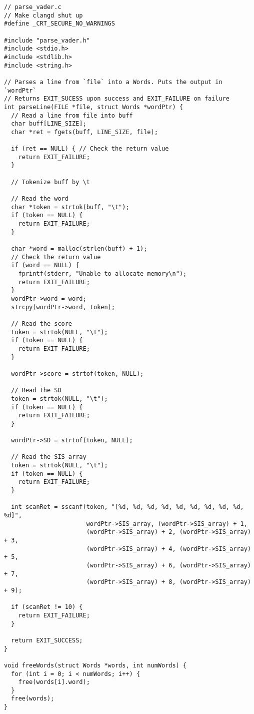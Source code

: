 \documentclass{article}
\theoremstyle{mytheoremstyle}
\theoremstyle{mytheoremstyle}
\theoremstyle{myproblemstyle}
\begin{document}
    \begin{lstlisting}
// parse_vader.c
// Make clangd shut up
#define _CRT_SECURE_NO_WARNINGS

#include "parse_vader.h"
#include <stdio.h>
#include <stdlib.h>
#include <string.h>

// Parses a line from `file` into a Words. Puts the output in `wordPtr`
// Returns EXIT_SUCESS upon success and EXIT_FAILURE on failure
int parseLine(FILE *file, struct Words *wordPtr) {
  // Read a line from file into buff
  char buff[LINE_SIZE];
  char *ret = fgets(buff, LINE_SIZE, file);

  if (ret == NULL) { // Check the return value
    return EXIT_FAILURE;
  }

  // Tokenize buff by \t

  // Read the word
  char *token = strtok(buff, "\t");
  if (token == NULL) {
    return EXIT_FAILURE;
  }

  char *word = malloc(strlen(buff) + 1);
  // Check the return value
  if (word == NULL) {
    fprintf(stderr, "Unable to allocate memory\n");
    return EXIT_FAILURE;
  }
  wordPtr->word = word;
  strcpy(wordPtr->word, token);

  // Read the score
  token = strtok(NULL, "\t");
  if (token == NULL) {
    return EXIT_FAILURE;
  }

  wordPtr->score = strtof(token, NULL);

  // Read the SD
  token = strtok(NULL, "\t");
  if (token == NULL) {
    return EXIT_FAILURE;
  }

  wordPtr->SD = strtof(token, NULL);

  // Read the SIS_array
  token = strtok(NULL, "\t");
  if (token == NULL) {
    return EXIT_FAILURE;
  }

  int scanRet = sscanf(token, "[%d, %d, %d, %d, %d, %d, %d, %d, %d, %d]",
                       wordPtr->SIS_array, (wordPtr->SIS_array) + 1,
                       (wordPtr->SIS_array) + 2, (wordPtr->SIS_array) + 3,
                       (wordPtr->SIS_array) + 4, (wordPtr->SIS_array) + 5,
                       (wordPtr->SIS_array) + 6, (wordPtr->SIS_array) + 7,
                       (wordPtr->SIS_array) + 8, (wordPtr->SIS_array) + 9);

  if (scanRet != 10) {
    return EXIT_FAILURE;
  }

  return EXIT_SUCCESS;
}

void freeWords(struct Words *words, int numWords) {
  for (int i = 0; i < numWords; i++) {
    free(words[i].word);
  }
  free(words);
}


\end{lstlisting}
\end{document}
